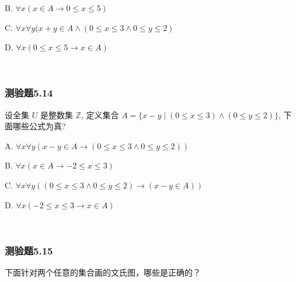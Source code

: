 \documentclass[UTF8, heading=true]{ctexart}
\begin{document}
B. $\forall x(x \in A \rightarrow 0 \leq x \leq 5)$

C. $\forall x \forall y(x+y \in A \wedge(0 \leq x \leq 3 \wedge 0 \leq y \leq 2)$

D. $\forall x(0 \leq x \leq 5 \rightarrow x \in A)$

\textcolor{white}{答案：BD}


\subsubsection{测验题5.14}
设全集 $U$ 是整数集 $\mathbb{Z}$, 定义集合 $A=\{x-y \mid(0 \leq x \leq 3) \wedge(0 \leq y \leq 2)\}$, 下面哪些公式为真?

A. 
$
\forall x \forall y(x-y \in A \rightarrow(0 \leq x \leq 3 \wedge 0 \leq y \leq 2))
$

B. 
$
\forall x(x \in A \rightarrow-2 \leq x \leq 3)
$

C. 
$
\forall x \forall y((0 \leq x \leq 3 \wedge 0 \leq y \leq 2) \rightarrow(x-y \in A))
$

D. 
$
\forall x(-2 \leq x \leq 3 \rightarrow x \in A)
$

\textcolor{white}{答案：BCD}

\subsubsection{测验题5.15}

下面针对两个任意的集合画的文氏图，哪些是正确的？
\end{document}
